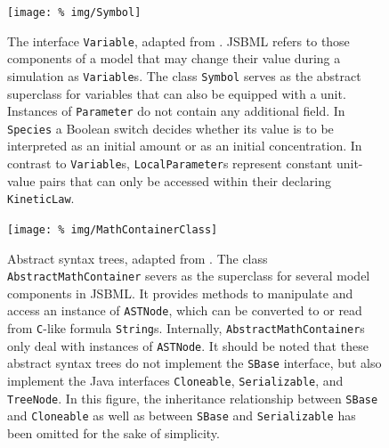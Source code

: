\documentclass[
  BCOR12mm,
  letterpaper,
  11pt,
  headsepline,
  pointlessnumbers,
  tablecaptionabove,
  onelinecaption,
  headinclude,
  appendixprefix,
  idxtotoc,
  bibtotoc,
  twoside,
  titlepage
]{scrartcl}
\begin{document}
\begin{figure}[p]
 \centering
 \texttt{[image: \%
img/Symbol]}
 \caption[The interface \texttt{Variable}]{The interface \texttt{Variable}, adapted from \citep{Draeger2011}. JSBML refers to those components of a model that may change their value during a simulation as \texttt{Variable}s. The class \texttt{Symbol} serves as the abstract superclass for variables that can also be equipped with a unit. Instances of \texttt{Parameter} do not contain any additional field. In \texttt{Species} a Boolean switch decides whether its value is to be interpreted as an initial amount or as an initial concentration. In contrast to \texttt{Variable}s, \texttt{LocalParameter}s represent constant unit-value pairs that can only be accessed within their declaring \texttt{KineticLaw}.}
 \label{fig:Variable}
\end{figure}
\begin{figure}[htb]
 \centering
 \texttt{[image: \%
img/MathContainerClass]}
 \caption[Abstract syntax trees]{Abstract syntax trees, adapted from
 \citep{Draeger2011}. The class \texttt{AbstractMathContainer} severs as the
 superclass for several model components in JSBML. It provides methods to
 manipulate and access an instance  of \texttt{ASTNode}, which can be converted
 to or read from \texttt{C}-like formula \texttt{String}s. Internally,
 \texttt{AbstractMathContainer}s only deal with instances of \texttt{ASTNode}.
 It should be noted that these abstract syntax trees do not implement the
 \texttt{SBase} interface, but also implement the Java interfaces
 \texttt{Cloneable}, \texttt{Serializable}, and \texttt{TreeNode}. In this
 figure, the inheritance relationship between
 \texttt{SBase} and \texttt{Cloneable} as well as between \texttt{SBase} and
 \texttt{Serializable} has been omitted for the sake of simplicity.}
 \label{fig:MathContainer}
\end{figure}
\end{document}
